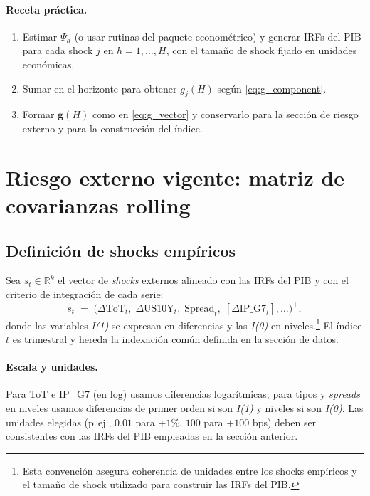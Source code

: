 \documentclass[11pt,a4paper]{article}
\newcommand{\1}{\mathbf{1}}
\newcommand{\vect}[1]{\boldsymbol{#1}}
\begin{document}
\paragraph{Receta práctica.}
\begin{enumerate}
  \item Estimar $\Psi_h$ (o usar rutinas del paquete econométrico) y generar IRFs del PIB para cada shock \(j\) en \(h=1,\dots,H\), con el tamaño de shock fijado en unidades económicas.
  \item Sumar en el horizonte para obtener $g_j(H)$ según \eqref{eq:g_component}.
  \item Formar $\vect{g}(H)$ como en \eqref{eq:g_vector} y conservarlo para la sección de riesgo externo y para la construcción del índice.
\end{enumerate}

\section{Riesgo externo vigente: matriz de covarianzas rolling}

\subsection{Definición de shocks empíricos}

Sea $s_t \in \mathbb{R}^{k}$ el vector de \emph{shocks} externos alineado con las IRFs del PIB y con el criterio de integración de cada serie:
\begin{equation}
\label{eq:shocks_def}
s_t 
\;=\;
\big(
\Delta \text{ToT}_t,\;
\Delta \text{US10Y}_t,\;
\text{Spread}_t,\;
[\Delta \text{IP\_G7}_t],\ldots
\big)^\top,
\end{equation}
donde las variables \emph{I(1)} se expresan en diferencias y las \emph{I(0)} en niveles.\footnote{Esta convención asegura coherencia de unidades entre los shocks empíricos y el tamaño de shock utilizado para construir las IRFs del PIB.}
El índice $t$ es trimestral y hereda la indexación común definida en la sección de datos.

\paragraph{Escala y unidades.}
Para ToT e IP\_G7 (en log) usamos diferencias logarítmicas; para tipos y \emph{spreads} en niveles usamos diferencias de primer orden si son \emph{I(1)} y niveles si son \emph{I(0)}. 
Las unidades elegidas (p.\,ej., \(0{.}01\) para \(+1\%\), \(100\) para \(+100\) bps) deben ser consistentes con las IRFs del PIB empleadas en la sección anterior.
\end{document}
